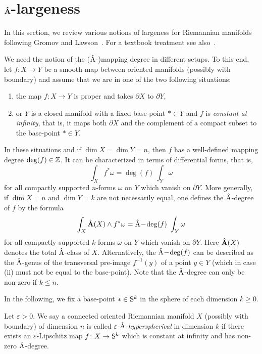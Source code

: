 \documentclass[pdftex]{sigma}
\numberwithin{equation}{section}
\begin{document}
\section[Ahat-largeness]{\(\boldsymbol{\hat{\mathrm{A}}}\)-largeness} \label{sec:largeness}
In this section, we review various notions of largeness for Riemannian manifolds following Gromov and Lawson~\cite{Gromov:MetricInequalitiesScalar, gromov-lawson:spin-and-scalar-in-presence,GromovLawson:PSCDiracComplete}.
For a textbook treatment see also~\cite[Chapter~IV, Section~5]{LawsonMichelsohn:SpinGeometry}.

We need the notion of the (\(\hat{\mathrm{A}}\)-)mapping degree in different setups.
To this end, let \(f \colon X \to Y\) be a smooth map between oriented manifolds (possibly with boundary) and assume that we are in one of the two following situations:
\begin{enumerate}\itemsep=0pt
 \item[(i)] the map \(f \colon X \to Y\) is proper and takes \(\partial X\) to \(\partial Y\),
 \item[(ii)] or \(Y\) is a closed manifold with a fixed base-point \(\ast \in Y\) and \(f\) is \emph{constant at infinity}, that is, it maps both \(\partial X\) and the complement of a compact subset to the base-point \(\ast \in Y\). %
\end{enumerate}
In these situations and if \(\dim X = \dim Y = n\), then \(f\) has a well-defined mapping degree \(\deg(f) \in \mathbb{Z}\).
It can be characterized in terms of differential forms, that is,
\[
 \int_X f^\ast \omega = \deg(f)\ \int_{Y} \omega
\]
for all compactly supported \(n\)-forms \(\omega\) on \(Y\) which vanish on \(\partial Y\).
More generally, if \(\dim X = n\) and \(\dim Y = k\) are not necessarily equal, one defines the \(\hat{\mathrm{A}}\)-degree of \(f\) by the formula
\[
 \int_X \hat{\mathbf{A}}(X) \wedge f^\ast \omega = \hat{\mathrm{A}}\!-\!\deg(f)\ \int_Y \omega
\]
for all compactly supported \(k\)-forms \(\omega\) on \(Y\) which vanish on \(\partial Y\).
Here \(\hat{\mathbf{A}}(X)\) denotes the total \(\hat{\mathrm{A}}\)-class of \(X\).
Alternatively, the \(\hat{\mathrm{A}}\!-\!\deg(f)\) can be described as the \(\hat{\mathrm{A}}\)-genus of the transversal pre-image \(f^{-1}(y)\) of a point \(y \in Y\) (which in case (ii) must not be equal to the base-point).
Note that the \(\hat{\mathrm{A}}\)-degree can only be non-zero if \(k \leq n\).

In the following, we fix a base-point \(\ast \in \mathrm{S}^k\) in the sphere of each dimension \(k \geq 0\).

\begin{Definition}
 Let \(\varepsilon > 0\).
 We say a connected oriented Riemannian manifold \(X\) (possibly with boundary) of dimension \(n\) is called \emph{\(\varepsilon\)-\(\hat{\mathrm{A}}\)-hyperspherical} in dimension \(k\) if there exists an \(\varepsilon\)-Lipschitz map \(f \colon X \to \mathrm{S}^k\) which is constant at infinity and has non-zero \(\hat{\mathrm{A}}\)-degree.
\end{Definition}
\end{document}
